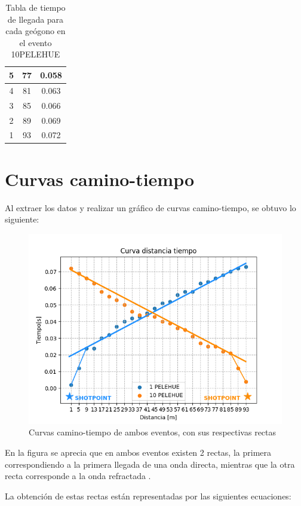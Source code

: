 \documentclass{article}
\theoremstyle{mytheoremstyle}
\theoremstyle{mytheoremstyle}
\theoremstyle{myproblemstyle}
\begin{document}
\begin{table}[h!]
\begin{tabular}{|c|c|c|}
			5                & 77                         & 0.058                   \\ \hline
			4                & 81                         & 0.063                   \\ \hline
			3                & 85                         & 0.066                   \\ \hline
			2                & 89                         & 0.069                   \\ \hline
			1                & 93                         & 0.072                   \\ \hline
			\end{tabular}
			\caption{Tabla de tiempo de llegada para cada geógono en el evento 10PELEHUE}

		\end{table}
	\newpage
	\section*{Curvas camino-tiempo}
	\newpage
	Al extraer los datos y realizar un gráfico de curvas camino-tiempo, se obtuvo lo siguiente:\par
	\begin{figure}[h!]
		\centering
		\includegraphics[width=\textwidth,center]{CurvaDist-tiempo.png}
		\caption[]{Curvas camino-tiempo de ambos eventos, con sus respectivas rectas }
	\end{figure}
	En la figura se aprecia que en ambos eventos existen 2 rectas, la primera correspondiendo a la primera llegada de una onda directa, mientras que la otra recta corresponde a la onda refractada
	.\par La obtención de estas rectas están representadas por las siguientes ecuaciones:
\end{document}
